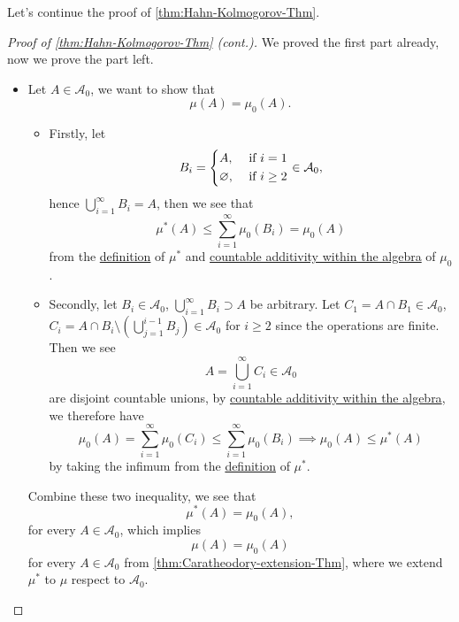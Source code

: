 Let's continue the proof of \autoref{thm:Hahn-Kolmogorov-Thm}.
\begin{proof}[Proof of \autoref{thm:Hahn-Kolmogorov-Thm} (cont.)]\label{pf:Hahn-Kolmogorov-Thm-cont}
	We proved the first part already, now we prove the part left.
	\begin{itemize}
		\item Let \(A\in \mathcal{A} _0\), we want to show that
		      \[
			      \mu (A) = \mu_0(A).
		      \]
		      \begin{itemize}
			      \item Firstly, let
			            \[
				            B_{i} = \begin{dcases}
					            A,            & \text{ if } i= 1    \\
					            \varnothing , & \text{ if } i\geq 2
				            \end{dcases}\in \mathcal{A} _0,
			            \]
			            hence \(\bigcup\limits_{i=1}^{\infty} B_{i} = A\), then we see that
			            \[
				            \mu ^{*} (A)\leq \sum\limits_{i=1}^{\infty} \mu _0(B_{i}) = \mu _0(A)
			            \]
			            from the \hyperref[prop:outer-measure]{definition} of \(\mu ^{*} \) and \hyperref[def:pre-measure-countable-additivity-within-the-algebra]{countable additivity within the algebra}
			            of \(\mu _0\).
			      \item Secondly, let \(B_{i}\in \mathcal{A} _0\), \(\bigcup\limits_{i=1}^{\infty} B_{i}\supset A\) be arbitrary.
			            Let \(C_1 = A\cap B_1\in \mathcal{A} _0\), \(C_{i} = A\cap B_{i}\setminus \left(\bigcup\limits_{j=1}^{i-1} B_{j}\right)\in \mathcal{A} _0\) for \(i\geq 2\)
			            since the operations are finite. Then we see
			            \[
				            A = \bigcup\limits_{i=1}^{\infty} C_{i}\in \mathcal{A} _0
			            \]
			            are disjoint countable unions, by \hyperref[def:pre-measure-countable-additivity-within-the-algebra]{countable additivity within the algebra},
			            we therefore have
			            \[
				            \mu _0(A) = \sum\limits_{i=1}^{\infty} \mu _0(C_{i}) \leq \sum\limits_{i=1}^{\infty} \mu_0 (B_{i})\implies \mu _0(A)\leq \mu ^{*} (A)
			            \]
			            by taking the infimum from the \hyperref[prop:outer-measure]{definition} of \(\mu ^{*} \).
		      \end{itemize}
		      Combine these two inequality, we see that
		      \[
			      \mu ^{*} (A) = \mu _0(A),
		      \]
		      for every \(A\in\mathcal{A} _0\), which implies
		      \[
			      \mu (A) = \mu _0(A)
		      \]
		      for every \(A\in \mathcal{A}_0\) from \autoref{thm:Caratheodory-extension-Thm}, where we extend \(\mu ^{*} \) to \(\mu \) respect to \(\mathcal{A}_0\).
	\end{itemize}
\end{proof}

